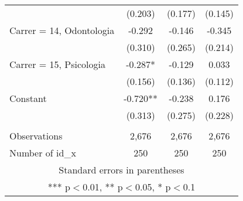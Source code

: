 \documentclass[]{article}
\begin{document}
\begin{tabular}{lccc}
 & (0.203) & (0.177) & (0.145) \\
Carrer = 14, Odontologia & -0.292 & -0.146 & -0.345 \\
 & (0.310) & (0.265) & (0.214) \\
Carrer = 15, Psicologia & -0.287* & -0.129 & 0.033 \\
 & (0.156) & (0.136) & (0.112) \\
Constant & -0.720** & -0.238 & 0.176 \\
 & (0.313) & (0.275) & (0.228) \\
 &  &  &  \\
Observations & 2,676 & 2,676 & 2,676 \\
 Number of id\_x & 250 & 250 & 250 \\ \hline
\multicolumn{4}{c}{ Standard errors in parentheses} \\
\multicolumn{4}{c}{ *** p$<$0.01, ** p$<$0.05, * p$<$0.1} \\
\end{tabular}
\end{document}
